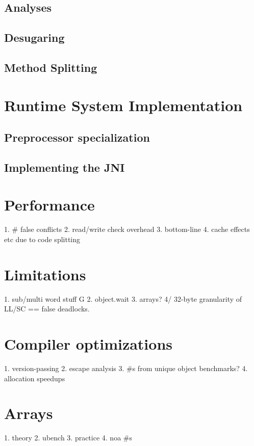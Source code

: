 \subsection{Analyses} %
\subsection{Desugaring} %
\subsection{Method Splitting}

\section{Runtime System Implementation}
\subsection{Preprocessor specialization}
\subsection{Implementing the JNI}

\section{Performance}\label{sec:full-bench}
   1. \# false conflicts
   2. read/write check overhead
   3. bottom-line
   4. cache effects etc due to code splitting

\section{Limitations}
   1. sub/multi word stuff
G   2. object.wait
   3. arrays?
   4/ 32-byte granularity of LL/SC == false deadlocks.

\section{Compiler optimizations}
   1. version-passing
   2. escape analysis
   3. \#s from unique object benchmarks?
   4. allocation speedups

\section{Arrays} %
   1. theory
   2. ubench
   3. practice
   4. noa \#s



